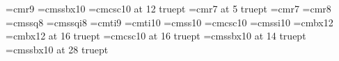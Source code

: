 %
%
%
%
%
%
%


%
%
\font\ninerm=cmr9
\font\tenssbx=cmssbx10
\font\twelvesc=cmcsc10 at 12 truept
\font\fivecmr=cmr7 at 5 truept
\font\sevencmr=cmr7
\font\eightcmr=cmr8
\font\eightcmssq=cmssq8
\font\eightcmssqi=cmssqi8
\font\ninecmti=cmti9
\font\tencmti=cmti10
\font\tencmss=cmss10
\font\tencmcsc=cmcsc10
\font\tencmssi=cmssi10
\font\twelvecmbx=cmbx12
\font\sixteencmbx=cmbx12 at 16 truept
\font\sixteencmsc=cmcsc10 at 16 truept
\font\fourteencmssbx=cmssbx10 at 14 truept
\font\twentyeightcmssbx=cmssbx10 at 28 truept
\def\thinspace{\kern .16667em }

